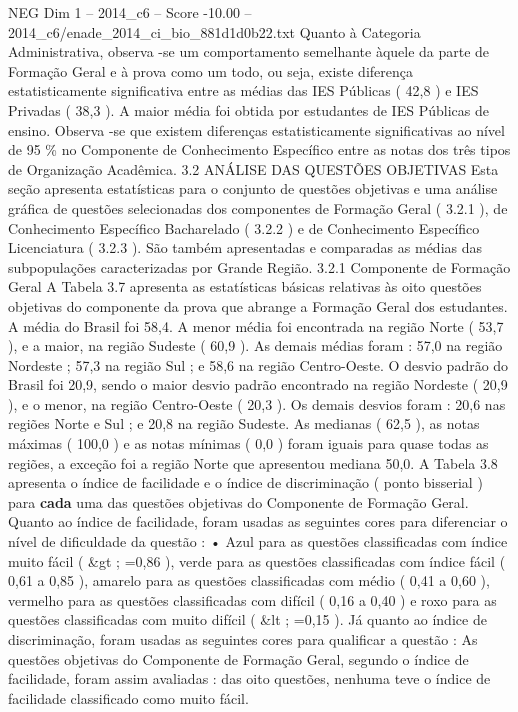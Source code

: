 \begin{textsample}{NEG Dim 1 – 2014\_c6 – Score -10.00 – 2014\_c6/enade\_2014\_ci\_bio\_881d1d0b22.txt}
Quanto à Categoria Administrativa, observa -se um comportamento semelhante àquele da parte de Formação Geral e à prova como um todo, ou seja, existe diferença estatisticamente significativa entre as médias das IES Públicas ( 42,8 ) e IES Privadas ( 38,3 ).
A maior média foi obtida por estudantes de IES Públicas de ensino.
Observa -se que existem diferenças estatisticamente significativas ao nível de 95 \% no Componente de Conhecimento Específico entre as notas dos três tipos de Organização Acadêmica. 3.2 ANÁLISE DAS QUESTÕES OBJETIVAS Esta seção apresenta estatísticas para o conjunto de questões objetivas e uma análise gráfica de questões selecionadas dos componentes de Formação Geral ( 3.2.1 ), de Conhecimento Específico Bacharelado ( 3.2.2 ) e de Conhecimento Específico Licenciatura ( 3.2.3 ).
São também apresentadas e comparadas as médias das subpopulações caracterizadas por Grande Região. 3.2.1 Componente de Formação Geral A Tabela 3.7 apresenta as estatísticas básicas relativas às oito questões objetivas do componente da prova que abrange a Formação Geral dos estudantes.
A média do Brasil foi 58,4.
A menor média foi encontrada na região Norte ( 53,7 ), e a maior, na região Sudeste ( 60,9 ).
As demais médias foram : 57,0 na região Nordeste ; 57,3 na região Sul ; e 58,6 na região Centro-Oeste.
O desvio padrão do Brasil foi 20,9, sendo o maior desvio padrão encontrado na região Nordeste ( 20,9 ), e o menor, na região Centro-Oeste ( 20,3 ).
Os demais desvios foram : 20,6 nas regiões Norte e Sul ; e 20,8 na região Sudeste.
As medianas ( 62,5 ), as notas máximas ( 100,0 ) e as notas mínimas ( 0,0 ) foram iguais para quase todas as regiões, a exceção foi a região Norte que apresentou mediana 50,0.
A Tabela 3.8 apresenta o índice de facilidade e o índice de discriminação ( ponto bisserial ) para \textbf{cada} uma das questões objetivas do Componente de Formação Geral.
Quanto ao índice de facilidade, foram usadas as seguintes cores para diferenciar o nível de dificuldade da questão : • Azul para as questões classificadas com índice muito fácil ( \&gt ; =0,86 ), verde para as questões classificadas com índice fácil ( 0,61 a 0,85 ), amarelo para as questões classificadas com médio ( 0,41 a 0,60 ), vermelho para as questões classificadas com difícil ( 0,16 a 0,40 ) e roxo para as questões classificadas com muito difícil ( \&lt ; =0,15 ).
Já quanto ao índice de discriminação, foram usadas as seguintes cores para qualificar a questão : As questões objetivas do Componente de Formação Geral, segundo o índice de facilidade, foram assim avaliadas : das oito questões, nenhuma teve o índice de facilidade classificado como muito fácil.

\end{textsample}
